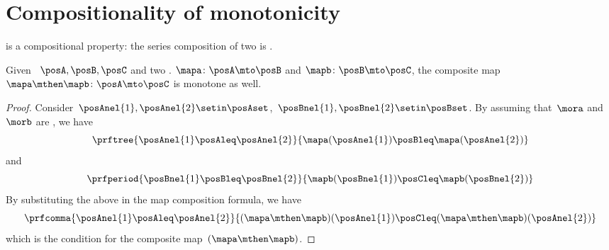 
\section{Compositionality of monotonicity}
 is a compositional property: the series composition of two  is .
\begin{lemma}\label{lem:monotonicity-compositional}
    Given ~$\posA,\posB,\posC$ and two .
    $\mapa\colon \posA \mto \posB$ and $\mapb\colon \posB \mto \posC$, the composite map~$\mapa\mthen \mapb\colon \posA \mto \posC$ is monotone as well.
\end{lemma}
\begin{proof}
    Consider~$\posAnel{1},\posAnel{2} \setin \posAset$,~$\posBnel{1},\posBnel{2}\setin \posBset$.
    By assuming that~$\mora$ and~$\morb$ are , we have
    \begin{equation}\label{eq:monotonicity-compositional-1}
        \prftree{\posAnel{1}\posAleq \posAnel{2}}{\mapa(\posAnel{1})\posBleq \mapa(\posAnel{2})}
    \end{equation}
    and
    \begin{equation}\label{eq:monotonicity-compositional-2}
        \prfperiod{\posBnel{1}\posBleq \posBnel{2}}{\mapb(\posBnel{1})\posCleq \mapb(\posBnel{2})}
    \end{equation}
    By substituting the above in the map composition formula, we have
    \begin{equation}\label{eq:monotonicity-compositional-3}
        \prfcomma{\posAnel{1}\posAleq \posAnel{2} }{ (\mapa\mthen \mapb)(\posAnel{1}) \posCleq (\mapa\mthen \mapb)(\posAnel{2})}
    \end{equation}
    which is the  condition for the composite map~$(\mapa\mthen\mapb)$.
\end{proof}